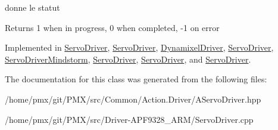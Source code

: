 donne le statut 

\begin{DoxyReturn}{Returns}
1 when in progress, 0 when completed, -\/1 on error 
\end{DoxyReturn}


Implemented in \hyperlink{classServoDriver_a0a8e84f0bbcff39549ddfc239f1a6237}{Servo\+Driver}, \hyperlink{classServoDriver_a0a8e84f0bbcff39549ddfc239f1a6237}{Servo\+Driver}, \hyperlink{classDynamixelDriver_a142a774bb716628483fa010727b84cdb}{Dynamixel\+Driver}, \hyperlink{classServoDriver_a0a8e84f0bbcff39549ddfc239f1a6237}{Servo\+Driver}, \hyperlink{classServoDriverMindstorm_acdb0988017ed22bad0bb3dcc848f03f1}{Servo\+Driver\+Mindstorm}, \hyperlink{classServoDriver_a0a8e84f0bbcff39549ddfc239f1a6237}{Servo\+Driver}, \hyperlink{classServoDriver_a0a8e84f0bbcff39549ddfc239f1a6237}{Servo\+Driver}, and \hyperlink{classServoDriver_a0a8e84f0bbcff39549ddfc239f1a6237}{Servo\+Driver}.



The documentation for this class was generated from the following files\+:\begin{DoxyCompactItemize}
\item 
/home/pmx/git/\+P\+M\+X/src/\+Common/\+Action.\+Driver/A\+Servo\+Driver.\+hpp\item 
/home/pmx/git/\+P\+M\+X/src/\+Driver-\/\+A\+P\+F9328\+\_\+\+A\+R\+M/Servo\+Driver.\+cpp\end{DoxyCompactItemize}
